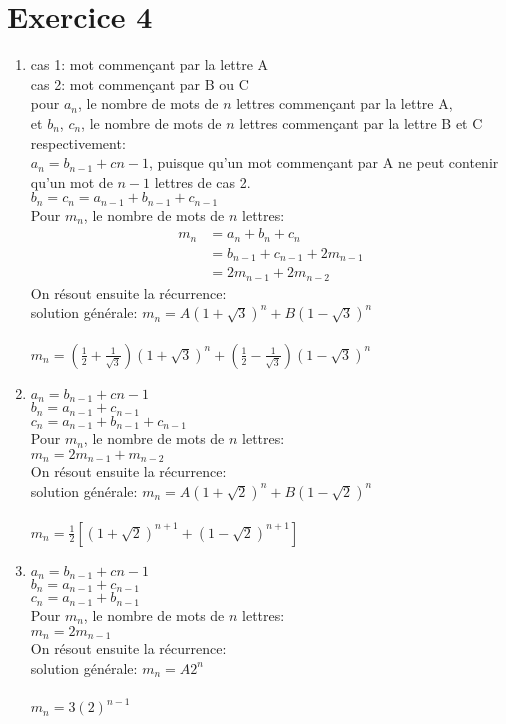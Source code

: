 \documentclass[fontsize=10pt]{article}
\begin{document}
\section*{Exercice 4}
\begin{enumerate}
\item 
cas 1: mot commençant par la lettre A\\
cas 2: mot commençant par B ou C\\
pour $a_n$, le nombre de mots de $n$ lettres commençant par la lettre A,\\
et $b_n$, $c_n$, le nombre de mots de $n$ lettres commençant par la lettre B et C respectivement:\\
$a_n = b_{n-1} + c{n-1}$, puisque qu'un mot commençant par A ne peut contenir qu'un mot de $n-1$ lettres de cas 2.\\
$b_n = c_n = a_{n-1} + b_{n-1} + c_{n-1}$ \\
Pour $m_n$, le nombre de mots de $n$ lettres:\\
\begin{align*}
m_n &= a_n + b_n + c_n\\
&= b_{n-1} + c_{n-1} + 2m_{n-1}\\
&= 2m_{n-1} + 2m_{n-2}
\end{align*}
On résout ensuite la récurrence:\\
solution générale: $m_n = A(1+\sqrt{3})^n + B(1-\sqrt{3})^n$\\\\
$m_n = (\frac{1}{2}+\frac{1}{\sqrt{3}})(1+\sqrt{3})^n + (\frac{1}{2}-\frac{1}{\sqrt{3}})(1-\sqrt{3})^n$

\item 
$a_n = b_{n-1} + c{n-1}$\\
$b_n = a_{n-1} + c_{n-1}$\\
$c_n = a_{n-1} + b_{n-1} + c_{n-1}$\\
Pour $m_n$, le nombre de mots de $n$ lettres:\\
$m_n = 2m_{n-1} + m_{n-2}$\\
On résout ensuite la récurrence:\\
solution générale: $m_n = A(1+\sqrt{2})^n + B(1-\sqrt{2})^n$\\\\
$m_n = \frac{1}{2}\left[(1+\sqrt{2})^{n+1} + (1-\sqrt{2})^{n+1} \right]$

\item 
$a_n = b_{n-1} + c{n-1}$\\
$b_n = a_{n-1} + c_{n-1}$\\
$c_n = a_{n-1} + b_{n-1}$\\
Pour $m_n$, le nombre de mots de $n$ lettres:\\
$m_n = 2m_{n-1}$\\
On résout ensuite la récurrence:\\
solution générale: $m_n = A2^n$\\\\
$m_n = 3(2)^{n-1}$
\end{enumerate}
\end{document}
